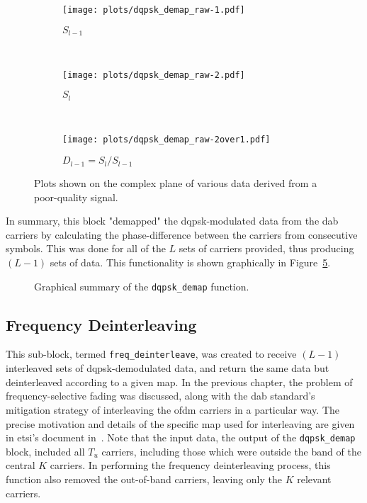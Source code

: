 \documentclass[class=report,11pt,crop=false]{standalone}
\begin{document}
\begin{figure}[htbp]
  \centering
  \captionsetup{type=figure}
  \begin{subfigure}[t]{0.3\textwidth}
    \centering
    \captionsetup{type=figure}
    \texttt{[image: plots/dqpsk\_demap\_raw-1.pdf]}
    \caption{\(S_{l-1}\)}
    \label{fig:dqpsk_demap_raw-1}
  \end{subfigure}%
  ~ 
  \begin{subfigure}[t]{0.3\textwidth}
    \centering
    \captionsetup{type=figure}
    \texttt{[image: plots/dqpsk\_demap\_raw-2.pdf]}
    \caption{\(S_{l}\)}
    \label{fig:dqpsk_demap_raw-2}
  \end{subfigure}
  ~ 
  \begin{subfigure}[t]{0.3\textwidth}
    \centering
    \captionsetup{type=figure}
    \texttt{[image: plots/dqpsk\_demap\_raw-2over1.pdf]}
    \caption{\(D_{l-1} = S_{l}/S_{l-1}\)}
    \label{fig:dqpsk_demap_raw-2over1}
  \end{subfigure}
  \caption{Plots shown on the complex plane of various data derived from a poor-quality  signal.}
  \label{fig:dqpsk_demap_raw}
\end{figure}

In summary, this block "demapped" the \gls{dqpsk}-modulated data from the \gls{dab} carriers by calculating the phase-difference between the carriers from consecutive symbols. This was done for all of the \(L\) sets of carriers provided, thus producing \((L-1)\) sets of data. This functionality is shown graphically in Figure~\ref{fig:dqpsk_demap}.

\begin{figure}[htbp]
  \centering
  \captionsetup{type=figure}
  \def\svgwidth{\linewidth}
  { %
      }
      \caption{Graphical summary of the \texttt{dqpsk\_demap} function.}
  \label{fig:dqpsk_demap}
\end{figure}

\subsection{Frequency Deinterleaving \label{subsect:dab-proc_freq-deinterleave}}
This sub-block, termed \texttt{freq\_deinterleave}, was created to receive \((L-1)\) interleaved sets of \gls{dqpsk}-demodulated data, and return the same data but deinterleaved according to a given map. In the previous chapter, the problem of frequency-selective fading was discussed, along with the \gls{dab} standard's mitigation strategy of interleaving the \gls{ofdm} carriers in a particular way. The precise motivation and details of the specific map used for interleaving are given in \gls{etsi}'s document in~\cite{dabstandard}. Note that the input data, the output of the \texttt{dqpsk\_demap} block, included all \(T_u\) carriers, including those which were outside the band of the central \(K\) carriers. In performing the frequency deinterleaving process, this function also removed the out-of-band carriers, leaving only the \(K\) relevant carriers.
\end{document}
